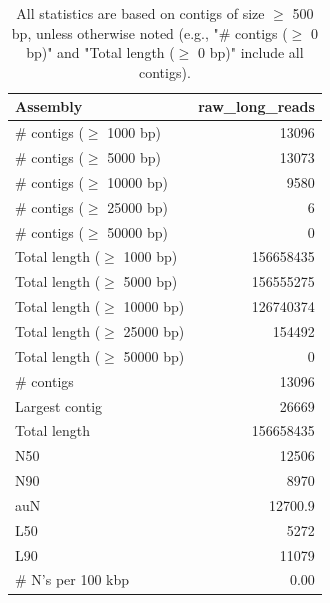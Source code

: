 \documentclass[12pt,a4paper]{article}
\begin{document}
\begin{table}[ht]
\begin{center}
\caption{All statistics are based on contigs of size $\geq$ 500 bp, unless otherwise noted (e.g., "\# contigs ($\geq$ 0 bp)" and "Total length ($\geq$ 0 bp)" include all contigs).}
\begin{tabular}{|l*{1}{|r}|}
\hline
Assembly & raw\_long\_reads \\ \hline
\# contigs ($\geq$ 1000 bp) & 13096 \\ \hline
\# contigs ($\geq$ 5000 bp) & 13073 \\ \hline
\# contigs ($\geq$ 10000 bp) & 9580 \\ \hline
\# contigs ($\geq$ 25000 bp) & 6 \\ \hline
\# contigs ($\geq$ 50000 bp) & 0 \\ \hline
Total length ($\geq$ 1000 bp) & 156658435 \\ \hline
Total length ($\geq$ 5000 bp) & 156555275 \\ \hline
Total length ($\geq$ 10000 bp) & 126740374 \\ \hline
Total length ($\geq$ 25000 bp) & 154492 \\ \hline
Total length ($\geq$ 50000 bp) & 0 \\ \hline
\# contigs & 13096 \\ \hline
Largest contig & 26669 \\ \hline
Total length & 156658435 \\ \hline
N50 & 12506 \\ \hline
N90 & 8970 \\ \hline
auN & 12700.9 \\ \hline
L50 & 5272 \\ \hline
L90 & 11079 \\ \hline
\# N's per 100 kbp & 0.00 \\ \hline
\end{tabular}
\end{center}
\end{table}
\end{document}
